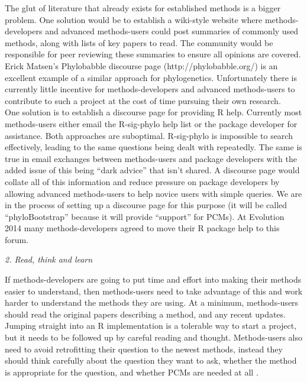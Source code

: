 \documentclass[a4paper,12pt]{article}
\renewcommand{\subsection}[1]{
  \bigskip
  \begin{center}
  \begin{large}
  \normalfont\itshape #1
  \end{large}
  \end{center}
}
\begin{document}
The glut of literature that already exists for established methods is a bigger problem. 
One solution would be to establish a wiki-style website where methods-developers and advanced methods-users could post summaries of commonly used methods, along with lists of key papers to read. 
The community would be responsible for peer reviewing these summaries to ensure all opinions are covered. 
Erick Matsen's Phylobabble discourse page (http://phylobabble.org/) is an excellent example of a similar approach for phylogenetics. Unfortunately there is currently little incentive for methods-developers and advanced methods-users to contribute to such a project at the cost of time pursuing their own research.\\

One solution is to establish a discourse page for providing R help. 
Currently most methods-users either email the R-sig-phylo help list or the package developer for assistance. 
Both approaches are suboptimal. 
R-sig-phylo is impossible to search effectively, leading to the same questions being dealt with repeatedly. 
The same is true in email exchanges between methods-users and package developers with the added issue of this being ``dark advice'' that isn't shared. 
A discourse page would collate all of this information and reduce pressure on package developers by allowing advanced methods-users to help novice users with simple queries. 
We are in the process of setting up a discourse page for this purpose (it will be called ``phyloBootstrap'' because it will provide ``support'' for PCMs). At Evolution 2014 many methods-developers agreed to move their R package help to this forum.

\subsection{2. Read, think and learn}
If methods-developers are going to put time and effort into making their methods easier to understand, then methods-users need to take advantage of this and work harder to understand the methods they are using. 
At a minimum, methods-users should read the original papers describing a method, and any recent updates. 
Jumping straight into an R implementation is a tolerable way to start a project, but it needs to be followed up by careful reading and thought. 
Methods-users also need to avoid retrofitting their question to the newest methods, instead they should think carefully about the question they want to ask, whether the method is appropriate for the question, and whether PCMs are
needed at all \citep{losos2011seeing}.\\
\end{document}
